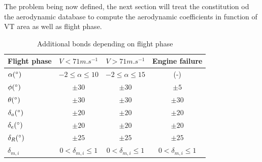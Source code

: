 The problem being now defined, the next section will treat the constitution od the aerodynamic database to compute the aerodynamic coefficients in function of VT area as well as flight phase.

\begin{table}[hbt!]
	\caption{\label{tab:Bonds} Additional bonds depending on flight phase}
	\centering
	\begin{tabular}{l|c|c|c}
		Flight phase & $V<71 m.s^{-1}$& $V>71 m.s^{-1}$ & Engine failure\\
		\hline
		$\alpha (\degree)$ & $-2\leq\alpha\leq 10$ & $-2\leq\alpha\leq 15$ & (-) \\
		$\phi (\degree)$ & $\pm 30$ & $\pm 30$ & $\pm 5$\\ 
		$\theta (\degree)$ & $\pm 30$ & $\pm 30$& $\pm 30$\\
		$\delta_a(\degree)$ & $\pm 20$& $\pm 20$& $\pm 20$\\
		$\delta_e(\degree)$ & $\pm 20$ & $\pm 20$ & $\pm 20$\\
		$\delta_R(\degree)$ & $\pm 25$ & $\pm 25$ & $\pm 25$\\
		$\delta_{m,i}$ & $0< \delta_{m,i} \leq 1$ & $0< \delta_{m,i} \leq 1$ & $0< \delta_{m,i} \leq 1$ \\
	\end{tabular}
\end{table}


